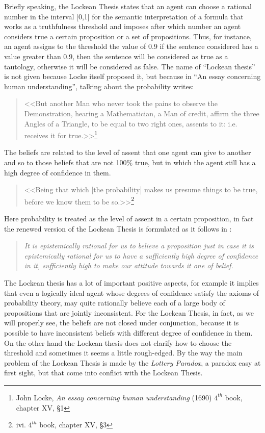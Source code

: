 \documentclass[a4paper, 12pt, oneside]{article}
\theoremstyle{plain}
\theoremstyle{definition}
\begin{document}
Briefly speaking, the Lockean Thesis states that an agent can choose a rational number in the interval [0,1] for the semantic interpretation of a formula that works as a truthfulness threshold and imposes after which number an agent considers true a certain proposition or a set of propositions. Thus, for instance, an agent assigns to the threshold the value of 0.9 if the sentence considered has a value greater than 0.9, then the sentence will be considered as true as a tautology, otherwise it will be considered as false. The name of ``Lockean thesis'' is  not given because Locke itself proposed it, but because in  ``An essay concerning human understanding'', talking about the probability writes:

\begin{quote}
	<<But another Man who never took the pains to observe the Demonstration, hearing a Mathematician, a Man of credit, affirm the three Angles of a Triangle, to be equal to two right ones, assents to it: i.e. receives it for true.>>\footnote{John Locke, \textit{An essay concerning human understanding} (1690) $4^{th}$ book, chapter XV, \S1}
\end{quote}

The beliefs are related to the level of assent that one agent can give to another and so to those beliefs that are not 100\% true, but in which the agent still has a high degree of confidence in them. 

\begin{quote}
	<<Being that which [the probability] makes us presume things to be true, before we know them to be so.>>\footnote{ivi. $4^{th}$ book, chapter XV, \S 3}
\end{quote}

Here probability is treated as the level of assent in a certain proposition, in fact the renewed version of the Lockean Thesis is formulated as it follows in \cite{Foley_epistemology}: 

\begin{quotation}
	\emph{It is epistemically rational for us to believe a proposition just in case it is epistemically rational for us to have a sufficiently high degree of confidence in it, sufficiently high to make our attitude towards it one of belief.}
\end{quotation}

The Lockean thesis has a lot of important positive aspects, for example it implies that even a logically ideal agent whose degrees of confidence satisfy the axioms of probability theory, may quite rationally believe each of a large body of propositions that are jointly inconsistent. For the Lockean Thesis, in fact, as we will properly see, the beliefs are not closed under conjunction, because it is possible to have inconsistent beliefs with different degree of confidence in them. On the other hand the Lockean thesis does not clarify how to choose the threshold and sometimes it seems a little rough-edged. By the way the main problem of the Lockean Thesis is made by the \textit{Lottery Paradox}, a paradox easy at first sight, but that come into conflict with the Lockean Thesis. 
\end{document}
